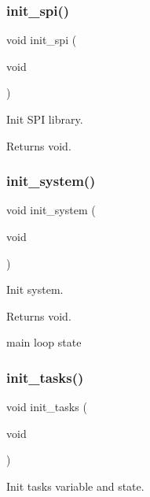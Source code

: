 \subsubsection{\texorpdfstring{init\+\_\+spi()}{init\_spi()}}
{\footnotesize\ttfamily void init\+\_\+spi (\begin{DoxyParamCaption}\item[{void}]{ }\end{DoxyParamCaption})}



Init S\+PI library. 

\begin{DoxyReturn}{Returns}
void. 
\end{DoxyReturn}
\mbox{\label{i2c-rain_8h_a348d23d5899ce59d18975284dfb0afc0}} 
\subsubsection{\texorpdfstring{init\+\_\+system()}{init\_system()}}
{\footnotesize\ttfamily void init\+\_\+system (\begin{DoxyParamCaption}\item[{void}]{ }\end{DoxyParamCaption})}



Init system. 

\begin{DoxyReturn}{Returns}
void. 
\end{DoxyReturn}
main loop state \mbox{\label{i2c-rain_8h_a2aae2290a141fddcea3fb6009acbb445}} 
\subsubsection{\texorpdfstring{init\+\_\+tasks()}{init\_tasks()}}
{\footnotesize\ttfamily void init\+\_\+tasks (\begin{DoxyParamCaption}\item[{void}]{ }\end{DoxyParamCaption})}



Init tasks variable and state. 


